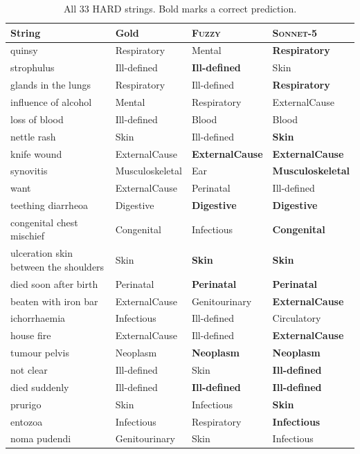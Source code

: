 \documentclass[11pt]{article}
\newcommand{\Bfuzzy}{\textsc{Fuzzy}}
\newcommand{\Mcomm}{\textsc{Sonnet-5}}
\begin{document}
\begin{table}[h]
\centering
\caption{All 33 HARD strings. Bold marks a correct prediction.}
\label{tab:hard}
\scriptsize
\begin{tabular}{llll}
\toprule
String & Gold & \Bfuzzy{} & \Mcomm{} \\
\midrule
quinsy & Respiratory & Mental & \textbf{Respiratory} \\
strophulus & Ill-defined & \textbf{Ill-defined} & Skin \\
glands in the lungs & Respiratory & Ill-defined & \textbf{Respiratory} \\
influence of alcohol & Mental & Respiratory & ExternalCause \\
loss of blood & Ill-defined & Blood & Blood \\
nettle rash & Skin & Ill-defined & \textbf{Skin} \\
knife wound & ExternalCause & \textbf{ExternalCause} & \textbf{ExternalCause} \\
synovitis & Musculoskeletal & Ear & \textbf{Musculoskeletal} \\
want & ExternalCause & Perinatal & Ill-defined \\
teething diarrheoa & Digestive & \textbf{Digestive} & \textbf{Digestive} \\
congenital chest mischief & Congenital & Infectious & \textbf{Congenital} \\
ulceration skin between the shoulders & Skin & \textbf{Skin} & \textbf{Skin} \\
died soon after birth & Perinatal & \textbf{Perinatal} & \textbf{Perinatal} \\
beaten with iron bar & ExternalCause & Genitourinary & \textbf{ExternalCause} \\
ichorrhaemia & Infectious & Ill-defined & Circulatory \\
house fire & ExternalCause & Ill-defined & \textbf{ExternalCause} \\
tumour pelvis & Neoplasm & \textbf{Neoplasm} & \textbf{Neoplasm} \\
not clear & Ill-defined & Skin & \textbf{Ill-defined} \\
died suddenly & Ill-defined & \textbf{Ill-defined} & \textbf{Ill-defined} \\
prurigo & Skin & Infectious & \textbf{Skin} \\
entozoa & Infectious & Respiratory & \textbf{Infectious} \\
noma pudendi & Genitourinary & Skin & Infectious \\

\end{tabular}
\end{table}
\end{document}
